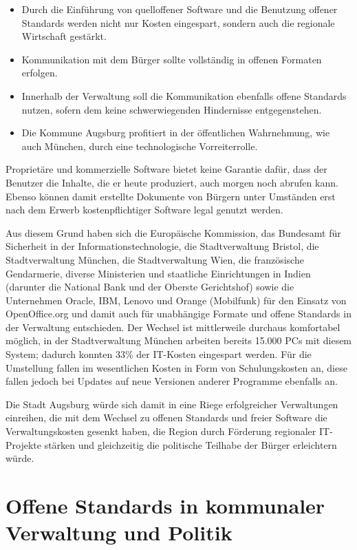   \begin{itemize}
    \item Durch die Einführung von quelloffener Software und die Benutzung 
    offener Standards werden nicht nur Kosten eingespart, sondern auch die 
    regionale Wirtschaft gestärkt.
    \item Kommunikation mit dem Bürger sollte vollständig in offenen Formaten 
    erfolgen.
    \item Innerhalb der Verwaltung soll die Kommunikation ebenfalls offene 
    Standards nutzen, sofern dem keine schwerwiegenden Hindernisse 
    entgegenstehen.
    \item Die Kommune Augsburg profitiert in der öffentlichen Wahrnehmung, wie 
    auch München, durch eine technologische Vorreiterrolle. 
  \end{itemize}
  
  Proprietäre und kommerzielle Software bietet keine Garantie dafür, dass der 
  Benutzer die Inhalte, die er heute produziert, auch morgen noch abrufen 
  kann. Ebenso können damit erstellte Dokumente von Bürgern unter Umständen 
  erst nach dem Erwerb kostenpflichtiger Software legal genutzt werden.
  
  Aus diesem Grund haben sich die Europäische Kommission, das Bundesamt für 
  Sicherheit in der Informationstechnologie, die Stadtverwaltung Bristol, die 
  Stadtverwaltung München, die Stadtverwaltung Wien, die französische 
  Gendarmerie, diverse Ministerien und staatliche Einrichtungen in Indien 
  (darunter die National Bank und der Oberste Gerichtshof) sowie die 
  Unternehmen Oracle, IBM, Lenovo und Orange (Mobilfunk) für den Einsatz von 
  OpenOffice.org und damit auch für unabhängige Formate und offene Standards 
  in der Verwaltung entschieden. Der Wechsel ist mittlerweile durchaus 
  komfortabel möglich, in der Stadtverwaltung München arbeiten bereits 15.000 
  PCs mit diesem System; dadurch konnten 33\% der IT-Kosten eingespart werden. 
  Für die Umstellung fallen im wesentlichen Kosten in Form von Schulungskosten 
  an, diese fallen jedoch bei Updates auf neue Versionen anderer Programme 
  ebenfalls an.
  
  Die Stadt Augsburg würde sich damit in eine Riege erfolgreicher Verwaltungen 
  einreihen, die mit dem Wechsel zu offenen Standards und freier Software die 
  Verwaltungskosten gesenkt haben, die Region durch Förderung regionaler 
  IT-Projekte stärken und gleichzeitig die politische Teilhabe der Bürger 
  erleichtern würde.
  
  \section{Offene Standards in kommunaler Verwaltung und Politik}
  
